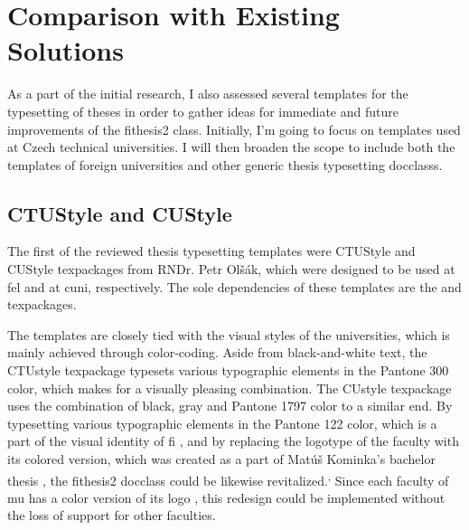 \section{Comparison with Existing Solutions}
As a part of the initial research, I also assessed several templates for the typesetting of theses in order to gather ideas for immediate and future improvements of the fithesis2 class. Initially, I'm going to focus on templates used at Czech technical universities. I will then broaden the scope to include both the templates of foreign universities and other generic thesis typesetting \glspl{docclass}.

  \subsection{CTUStyle and CUStyle}\label{sec:ctu&custyle}
  The first of the reviewed thesis typesetting templates were CTUStyle \cite{ctustyle} and CUStyle \cite{custyle} \glspl{texpackage} from RNDr. Petr Olšák, which were designed to be used at \gls{fel} and at \gls{cuni}, respectively. The sole dependencies of these templates are the  and  \glspl{texpackage}.

  The templates are closely tied with the visual styles of the universities, which is mainly achieved through color-coding. Aside from black-and-white text, the CTUstyle \gls{texpackage} typesets various typographic elements in the  Pantone 300 color, which makes for a visually pleasing combination. The CUstyle \gls{texpackage} uses the combination of black, gray and  Pantone 1797 color to a similar end. By typesetting various typographic elements in the  Pantone 122 color, which is a part of the visual identity of \gls{fi} \cite{filogo}, and by replacing the logotype of the faculty with its colored version, which was created as a part of Matúš Kominka's bachelor thesis \cite{Kominka08}, the fithesis2 \gls{docclass} could be likewise revitalized.\textsuperscript{,} Since each faculty of \gls{mu} has a color version of its logo \cite{muvis}, this redesign could be implemented without the loss of support for other faculties.

